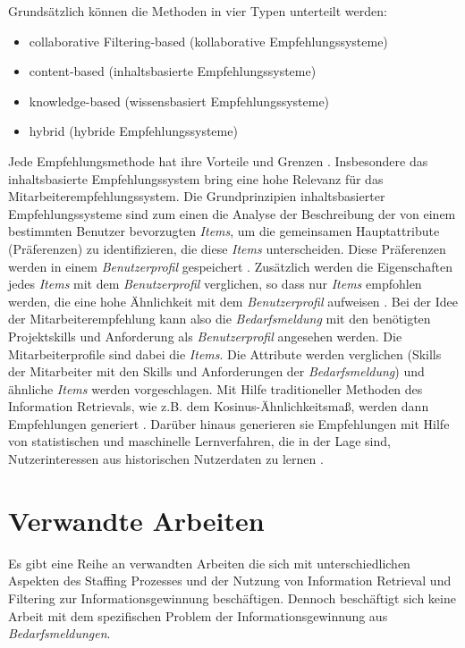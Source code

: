 Grundsätzlich können die Methoden in vier Typen unterteilt werden:
\begin{itemize}
	\item collaborative Filtering-based (kollaborative Empfehlungssysteme)
	\item content-based (inhaltsbasierte Empfehlungssysteme)
	\item knowledge-based (wissensbasiert Empfehlungssysteme)
	\item hybrid (hybride Empfehlungssysteme)
\end{itemize}
Jede Empfehlungsmethode hat ihre Vorteile und Grenzen \cite{lu2020recommender}. Insbesondere das inhaltsbasierte Empfehlungssystem bring eine hohe Relevanz für das Mitarbeiterempfehlungssystem. Die Grundprinzipien inhaltsbasierter Empfehlungssysteme sind zum einen die Analyse der Beschreibung der von einem bestimmten Benutzer bevorzugten \emph{Items}, um die gemeinsamen Hauptattribute (Präferenzen) zu identifizieren, die diese \emph{Items} unterscheiden. Diese Präferenzen werden in einem \emph{Benutzerprofil} gespeichert \cite{lu2020recommender}. Zusätzlich werden die Eigenschaften jedes \emph{Items} mit dem \emph{Benutzerprofil} verglichen, so dass nur \emph{Items} empfohlen werden, die eine hohe Ähnlichkeit mit dem \emph{Benutzerprofil} aufweisen \cite{lu2020recommender}. Bei der Idee der Mitarbeiterempfehlung kann also die \emph{Bedarfsmeldung} mit den benötigten Projektskills und Anforderung als \emph{Benutzerprofil} angesehen werden. Die Mitarbeiterprofile sind dabei die \emph{Items}. Die Attribute werden verglichen (Skills der Mitarbeiter mit den Skills und Anforderungen der \emph{Bedarfsmeldung}) und ähnliche \emph{Items} werden vorgeschlagen. Mit Hilfe traditioneller Methoden des Information Retrievals, wie z.B. dem Kosinus-Ähnlichkeitsmaß, werden dann Empfehlungen generiert \cite{lu2020recommender}. Darüber hinaus generieren sie Empfehlungen mit Hilfe von statistischen und maschinelle Lernverfahren, die in der Lage sind, Nutzerinteressen aus historischen Nutzerdaten zu lernen \cite{lu2020recommender}.
\section{Verwandte Arbeiten}
Es gibt eine Reihe an verwandten Arbeiten die sich mit unterschiedlichen Aspekten des Staffing Prozesses und der Nutzung von Information Retrieval und Filtering zur Informationsgewinnung beschäftigen. Dennoch beschäftigt sich keine Arbeit mit dem spezifischen Problem der Informationsgewinnung aus \emph{Bedarfsmeldungen}.

